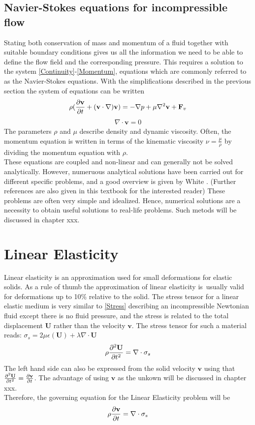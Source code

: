 \subsection{Navier-Stokes equations for incompressible flow}
Stating both conservation of mass and momentum of a fluid together with suitable boundary conditions gives us all the information we need to be able to define the flow field and the corresponding pressure. This requires a solution to the system \eqref{Continuity}-\eqref{Momentum}, equations which are commonly referred to as the Navier-Stokes equations. With the simplifications described in the previous section the system of equations can be written
\begin{align}
\rho(\frac{\partial \mathbf{v}}{\partial t} + (\mathbf{v} \cdot \nabla) \mathbf{v}) = -\nabla p + \mu\nabla^2 \mathbf{v} + \mathbf{F}_v \label{Navier}
\end{align}
\begin{align}
\nabla \cdot \mathbf{v} = 0 \label{Stokes}
\end{align}
The parameters $\rho$ and $\mu$ describe density and dynamic viscosity. Often, the momentum equation is written in terms of the kinematic viscosity $\nu = \frac{\mu}{\rho}$ by dividing the momentum equation with $\rho$. \\
These equations are coupled and non-linear and can generally not be solved analytically. However, numeruous analytical solutions have been carried out for different specific problems, and a good overview is given by White \cite[pp. 97-164]{Whit06}. (Further references are also given in this textbook for the interested reader) These problems are often very simple and idealized. Hence, numerical solutions are a necessity to obtain useful solutions to real-life problems. Such metods will be discussed in chapter xxx. 


\section{Linear Elasticity}
Linear elasticity is an approximation used for small deformations for elastic solids. As a rule of thumb the approximation of linear elasticity is usually valid for deformations up to 10\% relative to the solid. The stress tensor for a linear elastic medium is very similar to \eqref{Stress} describing an incompressible Newtonian fluid except there is no fluid pressure, and the stress is related to the total displacement $\mathbf{U}$ rather than the velocity $\mathbf{v}$. The stress tensor for such a material reads:
$\sigma_s = 2\mu\epsilon(\mathbf{U}) + \lambda \nabla \cdot \mathbf{U}$
\begin{align} 
\rho \frac{\partial ^2\mathbf{U}}{\partial t^2} = \nabla \cdot \sigma_s \label{LE}
\end{align}
The left hand side can also be expressed from the solid velocity $\mathbf{v}$ using that $\frac{\partial ^2\mathbf{U}}{\partial t^2} = \frac{\partial \mathbf{v}}{\partial t} $. The advantage of using $\mathbf{v}$ as the unkown will be discussed in chapter xxx.
\\
Therefore, the governing equation for the Linear Elasticity problem will be
\begin{align}
\rho \frac{\partial \mathbf{v}}{\partial t} = \nabla \cdot \sigma_s \label{LE2}
\end{align}
